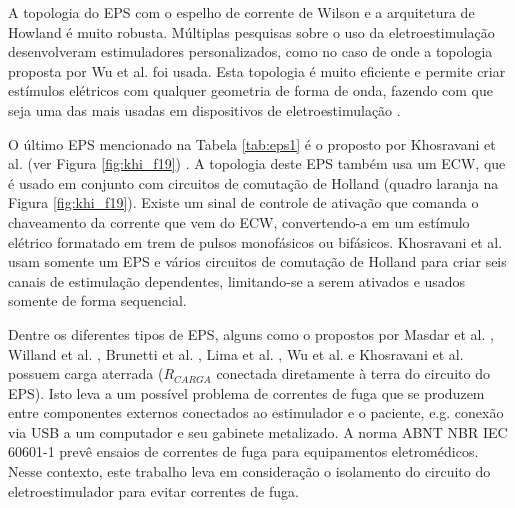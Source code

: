 A topologia do \acrshort{EPS} com o espelho de corrente de Wilson e a arquitetura de Howland é muito robusta. Múltiplas pesquisas sobre o uso da eletroestimulação desenvolveram estimuladores personalizados, como no caso de \cite{Faria2006, Wu2002, Kaczmarek1991, DeLima2002, NacimentoJunqueira2003, Paredes2016}  onde a topologia proposta por Wu et al. foi usada. Esta topologia é muito eficiente e permite criar estímulos elétricos com qualquer geometria de forma de onda, fazendo com que seja uma das mais usadas em dispositivos de eletroestimulação \cite{Wu2002}. 

O último \acrshort{EPS} mencionado na Tabela \ref{tab:eps1} é o proposto por Khosravani et al. (ver Figura \ref{fig:khi_f19}) \cite{KhosravaniSanaz2011}. A topologia deste \acrshort{EPS} também usa um \acrshort{ECW}, que é usado em conjunto com circuitos de comutação de Holland (quadro laranja na Figura \ref{fig:khi_f19}). Existe um sinal de controle de ativação que comanda o chaveamento da corrente que vem do \acrshort{ECW}, convertendo-a em um estímulo elétrico formatado em trem de pulsos monofásicos ou bifásicos. Khosravani et al. usam somente um \acrshort{EPS} e vários circuitos de comutação de Holland para criar seis canais de estimulação dependentes, limitando-se a serem ativados e usados somente de forma sequencial.

Dentre os diferentes tipos de \acrshort{EPS}, alguns como o propostos por Masdar et al. \cite{Masdar2013}, Willand et al. \cite{Willand2008}, Brunetti et al. \cite{Brunetti2011}, Lima et al. \cite{DeLima2002}, Wu et al. \cite{Wu2002} e Khosravani et al. \cite{KhosravaniSanaz2011} possuem carga aterrada ($R_{CARGA}$ conectada diretamente à terra do circuito do \acrshort{EPS}). Isto leva a um possível problema de correntes de fuga que se produzem entre componentes externos conectados ao estimulador e o paciente, e.g. conexão via \acrshort{USB} a um computador e seu gabinete metalizado. A norma \acrshort{ABNT} \acrshort{NBR} \acrshort{IEC} 60601-1 prevê ensaios de correntes de fuga para equipamentos eletromédicos. Nesse contexto, este trabalho leva em consideração o isolamento do circuito do eletroestimulador para evitar correntes de fuga.

